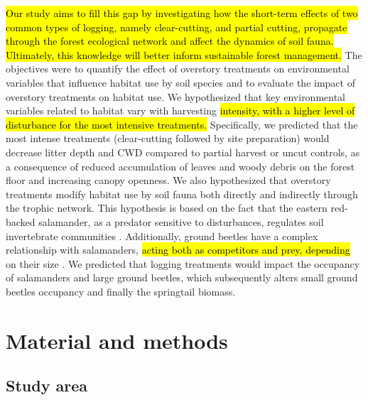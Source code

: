 \hl{Our study aims to fill this gap by investigating how the short-term effects of two common types of logging, namely clear-cutting, and partial cutting, propagate through the forest ecological network and affect the dynamics of soil fauna. 
Ultimately, this knowledge will better inform sustainable forest management. }
The objectives were to quantify the effect of overstory treatments on environmental variables that influence habitat use by soil species 
and to evaluate the impact of overstory treatments on habitat use. 
We hypothesized that key environmental variables related to habitat vary with harvesting \hl{intensity, with a higher level of disturbance for the most intensive treatments. }
Specifically, we predicted that the most intense treatments (clear-cutting followed by site preparation) would decrease litter depth and CWD compared to partial harvest or uncut controls, 
as a consequence of reduced accumulation of leaves and woody debris on the forest floor and increasing canopy openness. 
We also hypothesized that overstory treatments modify habitat use by soil fauna both directly and indirectly through the trophic network. 
This hypothesis is based on the fact that the eastern red-backed salamander, as a predator sensitive to disturbances, regulates soil invertebrate communities \citep{Wyman1998Experimentalassessment,MichaelWalton2005Salamandersforestfloor,Walton2006Salamandersforestfloor,Walton2013Topdownregulation,Hickerson2017Easternredbacked}. 
Additionally, ground beetles have a complex relationship with salamanders, \hl{acting both as competitors and prey, depending} on their size \citep{Jaeger1980MicrohabitatsTerrestrial,loveiEcologyBehaviorGround1996,Gall2003BehavioralInteractions}. 
We predicted that logging treatments would impact the occupancy of salamanders and large ground beetles, which subsequently alters small ground beetles occupancy and finally the springtail biomass. 


\section*{Material and methods}
\label{sec:matmet1}

\subsection*{Study area}
\label{subsec:area}

